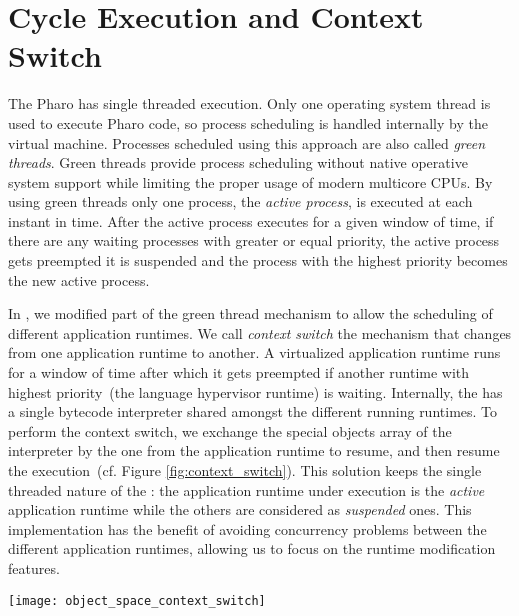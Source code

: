 



\section{Cycle Execution and Context Switch} \label{sec:context_switch}

The Pharo \VM has single threaded execution. Only one operating system thread is used to execute Pharo code, so process scheduling is handled internally by the virtual machine. Processes scheduled using this approach are also called \emph{green threads}. Green threads provide process scheduling without native operative system support while limiting the proper usage of modern multicore CPUs. By using green threads only one process, the \emph{active process}, is executed at each instant in time. After the active process executes for a given window of time, if there are any waiting processes with greater or equal priority, the active process gets preempted \ie it is suspended and the process with the highest priority becomes the new active process.

In \Vtt, we modified part of the green thread mechanism to allow the scheduling of different application runtimes. We call \emph{context switch} the mechanism that changes from one application runtime to another. A virtualized application runtime runs for a window of time after which it gets preempted if another runtime with highest priority~(the language hypervisor runtime) is waiting. Internally, the \VM has a single bytecode interpreter shared amongst the different running runtimes. To perform the context switch, we exchange the special objects array of the \VM interpreter by the one from the application runtime to resume, and then resume the \VM execution~(cf. Figure \ref{fig:context_switch}). This solution keeps the single threaded nature of the \VM: the application runtime under execution is the \emph{active} application runtime while the others are considered as \emph{suspended} ones. This implementation has the benefit of avoiding concurrency problems between the different application runtimes, allowing us to focus on the runtime modification features.


\begin{figure*}[htb]
\begin{center}
\texttt{[image: object\_space\_context\_switch]}
\caption{\textbf{Context Switch Internals.}To perform a context switch, we change the special objects array of the \VM's interpreter.\label{fig:context_switch}}
\end{center}
\end{figure*}

